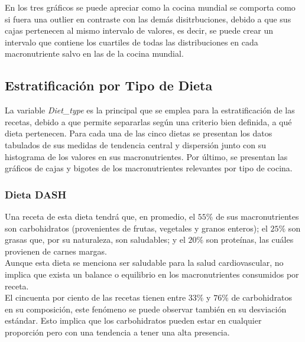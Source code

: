 \documentclass[12pt,a4paper]{article}
\begin{document}
        En los tres gráficos se puede apreciar como la cocina mundial se comporta 
        como si fuera una outlier en contraste con las demás disitrbuciones, debido 
        a que sus cajas pertenecen al mismo intervalo de valores, es decir, se puede 
        crear un intervalo que contiene los cuartiles de todas las distribuciones en 
        cada macronutriente salvo en las de la cocina mundial.

    \subsection{Estratificación por Tipo de Dieta}

        La variable \emph{Diet\_type} es la principal que se emplea para la 
        estratificación de las recetas, debido a que permite separarlas 
        según una criterio bien definida, a qué dieta pertenecen. Para cada 
        una de las cinco dietas se presentan los datos tabulados de sus 
        medidas de tendencia central y dispersión junto con su histograma 
        de los valores en sus macronutrientes. Por último, se presentan las 
        gráficos de cajas y bigotes de los macronutrientes relevantes por 
        tipo de cocina. \\

        \subsubsection{Dieta DASH}

            Una receta de esta dieta tendrá que, en promedio, el $55\%$ de sus 
            macronutrientes son carbohidratos (provenientes de frutas, vegetales 
            y granos enteros); el $25\%$ son grasas que, por su naturaleza, son 
            saludables; y el $20\%$ son proteínas, las cuáles provienen de carnes margas.\\
            Aunque esta dieta se menciona ser saludable para la salud cardiovascular, 
            no implica que exista un balance o equilibrio en los macronutrientes 
            consumidos por receta.\\

            El cincuenta por ciento de las recetas tienen entre $33\%$ y $76\%$ 
            de carbohidratos en su composición, este fenómeno se puede observar 
            también	en su desviación estándar. Esto implica que los carbohidratos 
            pueden estar en cualquier proporción pero con una tendencia a tener 
            una alta presencia.\\
\end{document}
